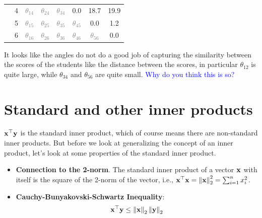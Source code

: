 \begin{boxedstuff}
\begin{example}
\begin{small}
\begin{center}
\begin{tabular}{lc|cccccc|}
                \multicolumn{1}{|l|}{} & 4 & \multicolumn{1}{c|}{\textcolor{gray}{$\theta_{14}$}} & \multicolumn{1}{c|}{\textcolor{gray}{$\theta_{24}$}} & \multicolumn{1}{c|}{\textcolor{gray}{$\theta_{34}$}} & \multicolumn{1}{c|}{0.0} & \multicolumn{1}{c|}{18.7} & 19.9 \\ \cline{2-8} 
                \multicolumn{1}{|l|}{} & 5 & \multicolumn{1}{c|}{\textcolor{gray}{$\theta_{15}$}} & \multicolumn{1}{c|}{\textcolor{gray}{$\theta_{25}$}} & \multicolumn{1}{c|}{\textcolor{gray}{$\theta_{35}$}} & \multicolumn{1}{c|}{\textcolor{gray}{$\theta_{45}$}} & \multicolumn{1}{c|}{0.0} & 1.2 \\ \cline{2-8} 
                \multicolumn{1}{|l|}{} & 6 & \multicolumn{1}{c|}{\textcolor{gray}{$\theta_{16}$}} & \multicolumn{1}{c|}{\textcolor{gray}{$\theta_{26}$}} & \multicolumn{1}{c|}{\textcolor{gray}{$\theta_{36}$}} & \multicolumn{1}{c|}{\textcolor{gray}{$\theta_{46}$}} & \multicolumn{1}{c|}{\textcolor{gray}{$\theta_{56}$}} & 0.0 \\ \hline
                \end{tabular}
            \end{center}
        \end{small}
    \end{example}
    It looks like the angles do not do a good job of capturing the similarity between the scores of the students like the distance between the scores, in particular $\theta_{12}$ is quite large, while $\theta_{34}$ and $\theta_{56}$ are quite small. \textcolor{blue}{Why do you think this is so?}
\end{boxedstuff}

\section{Standard and other inner products}
$\mathbf{x}^\top\mathbf{y}$ is the standard inner product, which of course means there are non-standard inner products. But before we look at generalizing the concept of an inner product, let's look at some properties of the standard inner product.
\begin{itemize}
    \item \textbf{Connection to the 2-norm}. The standard inner product of a vector $\mathbf{x}$ with itself is the square of the 2-norm of the vector, i.e., $\mathbf{x}^\top\mathbf{x} = \left\lVert \mathbf{x} \right\rVert_2^2 = \sum_{i=1}^n x_i^2$.
    \item \textbf{Cauchy-Bunyakovski-Schwartz Inequality}:
    \begin{equation}
        \mathbf{x}^\top\mathbf{y} \leq \left\lVert \mathbf{x} \right\rVert_2 \left\lVert \mathbf{y} \right\rVert_2
        \label{eq:cauchy-schwartz}
    \end{equation}
\end{itemize}

